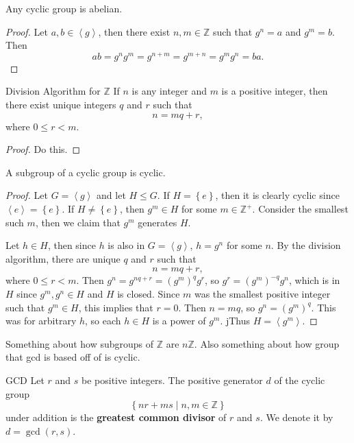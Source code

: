 \documentclass[10pt]{report}
\begin{document}
\begin{prop}
	Any cyclic group is abelian.
\end{prop}
\begin{proof}
	Let $a,b \in \left\langle g \right\rangle$, then there exist $n,m \in \mathbb{Z}$ such that $g^n=a$ and $g^m=b$. Then
	\[
	ab = g^n g^m = g^{n+m}=g^{m+n}=g^m g^n=ba.
	\] 
\end{proof}

\begin{thrm}{Division Algorithm for $\mathbb{Z}$}{}
If $n$ is any integer and $m$ is a positive integer, then there exist unique integers $q$ and $r$ such that
\[
n = mq + r,
\] where $0 \leq r < m.$
\end{thrm}
\begin{proof}
	{\color{red}Do this.}
\end{proof}

\begin{prop}
	A subgroup of a cyclic group is cyclic.
\end{prop}
\begin{proof}
	Let $G = \left\langle g \right\rangle$ and let $H \leq G$. If $H = \left\{ e \right\}$, then it is clearly cyclic since $\left\langle e \right\rangle = \left\{ e \right\}$. If $H \neq \left\{ e \right\}$, then $g^{m}\in H$ for some $m \in \mathbb{Z}^+$. Consider the smallest such $m$, then we claim that $g^m$ generates $H$.

	Let $h \in H$, then since $h$ is also in $G = \left\langle g \right\rangle$, $h = g^n$ for some $n$. By the division algorithm, there are unique $q$ and $r$ such that
	\[
	n = mq+r,
\] where $0 \leq r < m$. Then $g^n = g^{nq+r}= (g^m)^q g^r$, so $g^r = (g^m)^{-q}g^n$, which is in $H$ since $g^m, g^n \in H$ and $H$ is closed. Since $m$ was the smallest positive integer such that $g^m \in H$, this implies that $r=0$. Then $n=mq$, so $g^n = (g^m)^q$. This was for arbitrary $h$, so each $h \in H$ is a power of $g^m$. jThus $H = \left\langle g^m \right\rangle$.
\end{proof}

{\color{red}Something about how subgroups of $\mathbb{Z}$ are $n\mathbb{Z}$. Also something about how group that gcd is based off of is cyclic.}

\begin{defn}{GCD}{}
Let $r$ and $s$ be positive integers. The positive generator $d$ of the cyclic group
\[
\left\{ nr+ms \;|\; n,m \in \mathbb{Z} \right\}
\] under addition is the \textbf{greatest common divisor} of $r$ and $s$. We denote it by $d = \gcd(r,s)$.
\end{defn}
\end{document}
